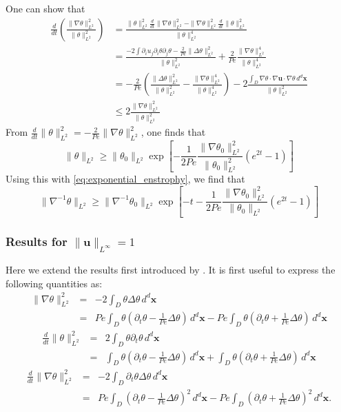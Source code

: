\documentclass{jfm}
\newcommand{\ddt}[1]{\frac{d #1}{dt}}
\newcommand{\hmone}[1]{\|\nabla^{-1} #1\|_{L^{2}}}
\newcommand{\ltwo}[1]{\|#1\|_{L^{2}}}
\newcommand{\hone}[1]{\| \nabla #1\|_{L^{2}}}
\newcommand{\sint}[1]{\int_{D} #1 \, d^{d}\mathbf{x}}
\renewcommand{\vec}[1]{\mathbf{#1}}
\newcommand{\linf}[1]{\| #1 \|_{L^{\infty}}}
\renewcommand{\u}{\mathbf{u}}
\newcommand{\ppt}[1]{\partial_{t} #1}
\newcommand{\lap}{\Delta }
\begin{document}
One can show that 
%
\begin{subequations}
\begin{align}
\frac{d}{dt}\left(\frac{\|\nabla\theta\|_{L^{2}}^2}{\|\theta\|_{L^{2}}^2}\right) &= \frac{\|\theta\|_{L^{2}}^2\frac{d}{dt}\|\nabla\theta\|_{L^{2}}^2-\|\nabla\theta\|_{L^{2}}^2\frac{d}{dt}\|\theta\|_{L^{2}}^2}{\|\theta\|_{L^{2}}^4}\\
&= \frac{-2\int \partial_{i}u_{j}\partial_{i}\theta\partial_{j}\theta - \frac{2}{Pe} \|\Delta\theta\|_{L^{2}}^2}{\|\theta\|_{L^{2}}^2}+\frac{2}{Pe}\frac{\|\nabla\theta\|_{L^{2}}^4}{\|\theta\|_{L^{2}}^4} \\
&=-\frac{2}{Pe}\left(\frac{\|\Delta\theta\|_{L^{2}}^2}{\|\theta\|_{L^{2}}^2} - \frac{\|\nabla\theta\|_{L^{2}}^4}{\|\theta\|_{L^{2}}^4} \right) - 2\frac{\sint{\nabla\theta \cdot \nabla\vec{u} \cdot 
							\nabla\theta  }}{\|\theta\|_{L^{2}}^2} 
\\
&\leq 2 \frac{\hone{\theta}^2}{\ltwo{\theta}^2}
\end{align}
\end{subequations}
%
From $\ddt{}\ltwo{\theta}^2 = -\frac{2}{Pe} \hone{\theta}^2$, one finds that 
\begin{equation}
\ltwo{\theta}\geq  \ltwo{\theta_{0}}\exp\left[-\frac{1}{2Pe}\frac{\hone{\theta_{0}}^2}{\ltwo{\theta_{0}}^2}\left(e^{2 t} -1\right)\right]
\end{equation}
Using this with \eqref{eq:exponential_enstrophy}, we find that 
\begin{equation}
\hmone{\theta} \geq  \hmone{\theta_{0}} \exp\left[- t -\frac{1}{2 Pe}\frac{\hone{\theta_{0}}^2}{\ltwo{\theta_{0}}}\left(e^{2 t} -1\right)\right]
\end{equation}

\subsubsection{Results for $\linf{\u}= 1$}
Here we extend the results first introduced by \cite{Chi-Cheu1996}.  It is first useful to express the following quantities as:
%
\begin{eqnarray}
	 \hone{\theta}^2 &=& - 2\sint{\theta \lap \theta} \\
	 							&=& Pe \sint{\theta\left(\ppt{\theta}
	 									-\frac{1}{Pe}\lap \theta\right)} 
	 									-Pe \sint{\theta\left(\ppt{\theta}
	 									+\frac{1}{Pe}\lap \theta\right)} 
\end{eqnarray}
%
\begin{eqnarray}
	\ddt{}\ltwo{\theta}^2 &=& 2\sint{\theta\ppt{\theta}} \\
										 &=&\sint{\theta\left(\ppt{\theta}
	 									-\frac{1}{Pe}\lap \theta\right)} 
										 + \sint{\theta\left(\ppt{\theta}
	 									+\frac{1}{Pe}\lap \theta\right)} 
\end{eqnarray}
%
\begin{eqnarray}
	\ddt{}\hone{\theta}^2 &=& -2\sint{\ppt{\theta}\lap \theta} \\
	 									&=& Pe \sint{\left(\ppt{\theta}
	 									-\frac{1}{Pe}\lap \theta\right)^2} 
	 									-Pe \sint{\left(\ppt{\theta}
	 									+\frac{1}{Pe}\lap \theta\right)^2} .
\end{eqnarray}
\end{document}
